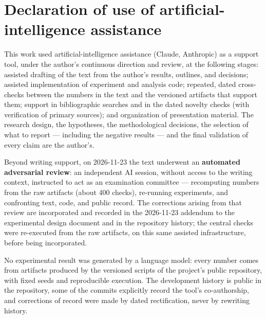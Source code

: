 \chapter*{Declaration of use of artificial-intelligence assistance}
\thispagestyle{empty}

This work used artificial-intelligence assistance (Claude, Anthropic)
as a support tool, under the author's continuous direction and review,
at the following stages: assisted drafting of the text from the
author's results, outlines, and decisions; assisted implementation of
experiment and analysis code; repeated, dated cross-checks between the
numbers in the text and the versioned artifacts that support them;
support in bibliographic searches and in the dated novelty checks
(with verification of primary sources); and organization of
presentation material. The research design, the hypotheses, the
methodological decisions, the selection of what to report ---
including the negative results --- and the final validation of every
claim are the author's.

Beyond writing support, on 2026-11-23 the text underwent an
\textbf{automated adversarial review}: an independent AI session,
without access to the writing context, instructed to act as an
examination committee --- recomputing numbers from the raw artifacts
(about 400 checks), re-running experiments, and confronting text,
code, and public record. The corrections arising from that review are
incorporated and recorded in the 2026-11-23 addendum to the
experimental design document and in the repository history; the
central checks were re-executed from the raw artifacts, on this same
assisted infrastructure, before being incorporated.

No experimental result was generated by a language model: every
number comes from artifacts produced by the versioned scripts of the
project's public repository, with fixed seeds and reproducible
execution. The development history is public in the repository, some
of the commits explicitly record the tool's co-authorship, and
corrections of record were made by dated rectification, never by
rewriting history.
